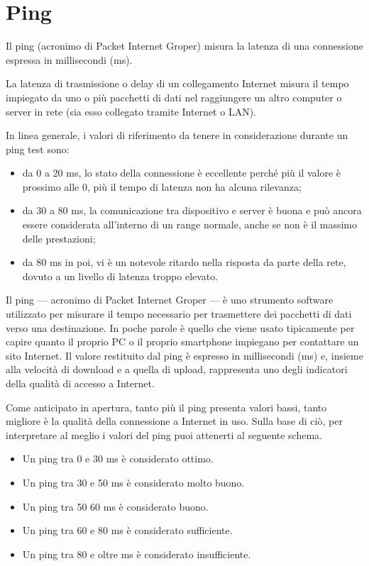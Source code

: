 
\section{Ping}
Il ping (acronimo di Packet Internet Groper) misura la latenza di una connessione espressa in millisecondi (ms).

La latenza di trasmissione o delay di un collegamento Internet misura il tempo impiegato da uno o più pacchetti di dati nel raggiungere un altro computer o server in rete (sia esso collegato tramite Internet o LAN).

In linea generale, i valori di riferimento da tenere in considerazione durante un ping test sono:
\begin{itemize}
    \item da 0 a 20 ms, lo stato della connessione è eccellente perché più il valore è prossimo alle 0, più il tempo di latenza non ha alcuna rilevanza;
    \item da 30 a 80 ms, la comunicazione tra dispositivo e server è buona e può ancora essere considerata all'interno di un range normale, anche se non è il massimo delle prestazioni;
    \item da 80 ms in poi, vi è un notevole ritardo nella risposta da parte della rete, dovuto a un livello di latenza troppo elevato.
\end{itemize}

Il ping — acronimo di Packet Internet Groper — è uno strumento software utilizzato per misurare il tempo necessario per trasmettere dei pacchetti di dati verso una destinazione. 
In poche parole è quello che viene usato tipicamente per capire quanto il proprio PC o il proprio smartphone impiegano per contattare un sito Internet. 
Il valore restituito dal ping è espresso in millisecondi (ms) e, insieme alla velocità di download e a quella di upload, rappresenta uno degli indicatori della qualità di accesso a Internet.

Come anticipato in apertura, tanto più il ping presenta valori bassi, tanto migliore è la qualità della connessione a Internet in uso. 
Sulla base di ciò, per interpretare al meglio i valori del ping puoi attenerti al seguente schema.
\begin{itemize}
    \item Un ping tra 0 e 30 ms è considerato ottimo.
    \item Un ping tra 30 e 50 ms è considerato molto buono.
    \item Un ping tra 50 60 ms è considerato buono.
    \item Un ping tra 60 e 80 ms è considerato sufficiente.
    \item Un ping tra 80 e oltre ms è considerato insufficiente.
\end{itemize}


